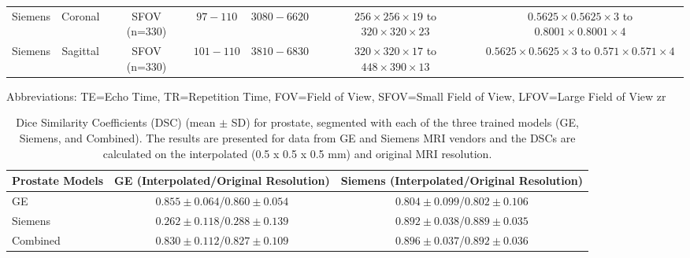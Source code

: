 \begin{table}[ht]
\begin{tabular}{lcccccc}
          Siemens & Coronal & SFOV (n=330) & $97 - 110$ & $3080 - 6620$&  
                \shortstack{$256  \times 256 \times 19$ to \\ $320 \times 320 \times 23$} & 
                \shortstack{$0.5625 \times 0.5625 \times 3$ to\\ $0.8001 \times 0.8001 \times 4$} \\
          Siemens & Sagittal & SFOV (n=330) & $101 - 110$ & $3810 - 6830$&  
                \shortstack{$320  \times 320 \times 17$ to \\ $448 \times 390 \times 13$} &
                \shortstack{$0.5625 \times 0.5625 \times 3$ to\\ $0.571 \times 0.571 \times 4$} \\
         \hline
    \end{tabular}
    Abbreviations: TE=Echo Time, TR=Repetition Time, FOV=Field of View, SFOV=Small Field of View, LFOV=Large Field of View
    \label{tab:dataset}
zr\end{table} 

\newpage
\begin{table}[ht]
    \caption{Dice Similarity Coefficients (DSC) (mean $\pm$ SD) for prostate, segmented with each of the three trained models (GE, Siemens, and Combined). The results are presented for data from GE and Siemens MRI vendors and the DSCs are calculated on the interpolated (0.5 x 0.5 x 0.5 mm) and original MRI resolution.}
    \begin{tabular}{lcc}
         \hline
          \textbf{Prostate Models} & \textbf{GE (Interpolated/Original Resolution)} & \textbf{Siemens (Interpolated/Original Resolution)}\\
         \hline
         GE & $0.855\pm0.064$/$\mathbf{0.860\pm0.054}$ & $0.804\pm0.099$/$0.802\pm0.106$ \\
         \hline
         Siemens & $0.262\pm0.118$/$0.288\pm0.139$ & $0.892\pm0.038$/$0.889\pm0.035$ \\
         \hline
         Combined & $0.830\pm0.112$/$0.827\pm0.109$ & $\mathbf{0.896\pm0.037}$/$0.892\pm0.036$\\
         \hline
    \end{tabular}
    \label{tab:res_prost}
\end{table} 

